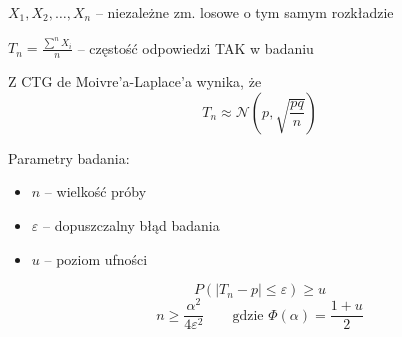 \documentclass[../Matematyka.tex]{subfiles}
\begin{document}
\(X_1, X_2, \ldots, X_n\) -- niezależne zm. losowe o tym samym rozkładzie

\(T_n = \frac{\sum^{n}X_i}{n}\) -- częstość odpowiedzi TAK w badaniu

Z CTG de Moivre'a-Laplace'a wynika, że
\[T_n \approx \mathcal{N}(p, \sqrt{\frac{pq}{n}})\]

Parametry badania:
\begin{itemize}
    \item \(n\) -- wielkość próby
    \item \(\varepsilon\) -- dopuszczalny błąd badania
    \item \(u\) -- poziom ufności
\end{itemize}

\[P(|T_n - p| \leq \varepsilon) \geq u\]
\[n \geq \frac{\alpha^2}{4\varepsilon^2} \qquad \text{gdzie } \Phi(\alpha) = \frac{1+u}{2}\]
\end{document}
